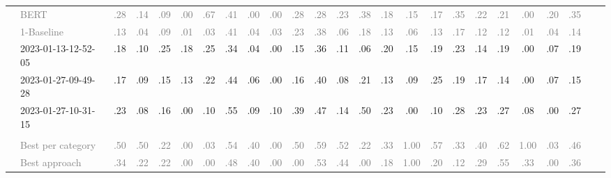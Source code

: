 \begin{table*}
\begin{tabular}{@{}ll@{\hspace{10pt}}c@{\hspace{5pt}}cccccccccccccccccccccc@{}}
& \textcolor{gray}{BERT} & \textcolor{gray}{.28} & \textcolor{gray}{.14} & \textcolor{gray}{.09} & \textcolor{gray}{.00} & \textcolor{gray}{.67} & \textcolor{gray}{.41} & \textcolor{gray}{.00} & \textcolor{gray}{.00} & \textcolor{gray}{.28} & \textcolor{gray}{.28} & \textcolor{gray}{.23} & \textcolor{gray}{.38} & \textcolor{gray}{.18} & \textcolor{gray}{.15} & \textcolor{gray}{.17} & \textcolor{gray}{.35} & \textcolor{gray}{.22} & \textcolor{gray}{.21} & \textcolor{gray}{.00} & \textcolor{gray}{.20} & \textcolor{gray}{.35} \\
& \textcolor{gray}{1-Baseline} & \textcolor{gray}{.13} & \textcolor{gray}{.04} & \textcolor{gray}{.09} & \textcolor{gray}{.01} & \textcolor{gray}{.03} & \textcolor{gray}{.41} & \textcolor{gray}{.04} & \textcolor{gray}{.03} & \textcolor{gray}{.23} & \textcolor{gray}{.38} & \textcolor{gray}{.06} & \textcolor{gray}{.18} & \textcolor{gray}{.13} & \textcolor{gray}{.06} & \textcolor{gray}{.13} & \textcolor{gray}{.17} & \textcolor{gray}{.12} & \textcolor{gray}{.12} & \textcolor{gray}{.01} & \textcolor{gray}{.04} & \textcolor{gray}{.14} \\
& 2023-01-13-12-52-05 & .18 & .10 & .25 & .18 & .25 & .34 & .04 & .00 & .15 & .36 & .11 & .06 & .20 & .15 & .19 & .23 & .14 & .19 & .00 & .07 & .19 \\
& 2023-01-27-09-49-28 & .17 & .09 & .15 & .13 & .22 & .44 & .06 & .00 & .16 & .40 & .08 & .21 & .13 & .09 & .25 & .19 & .17 & .14 & .00 & .07 & .15 \\
& 2023-01-27-10-31-15 & .23 & .08 & .16 & .00 & .10 & .55 & .09 & .10 & .39 & .47 & .14 & .50 & .23 & .00 & .10 & .28 & .23 & .27 & .08 & .00 & .27 \\
\addlinespace
\multicolumn{2}{@{}l}{\emph{New York Times}} \\
& \textcolor{gray}{Best per category} & \textcolor{gray}{.50} & \textcolor{gray}{.50} & \textcolor{gray}{.22} & \textcolor{gray}{.00} & \textcolor{gray}{.03} & \textcolor{gray}{.54} & \textcolor{gray}{.40} & \textcolor{gray}{.00} & \textcolor{gray}{.50} & \textcolor{gray}{.59} & \textcolor{gray}{.52} & \textcolor{gray}{.22} & \textcolor{gray}{.33} & \textcolor{gray}{1.00} & \textcolor{gray}{.57} & \textcolor{gray}{.33} & \textcolor{gray}{.40} & \textcolor{gray}{.62} & \textcolor{gray}{1.00} & \textcolor{gray}{.03} & \textcolor{gray}{.46} \\
& \textcolor{gray}{Best approach} & \textcolor{gray}{.34} & \textcolor{gray}{.22} & \textcolor{gray}{.22} & \textcolor{gray}{.00} & \textcolor{gray}{.00} & \textcolor{gray}{.48} & \textcolor{gray}{.40} & \textcolor{gray}{.00} & \textcolor{gray}{.00} & \textcolor{gray}{.53} & \textcolor{gray}{.44} & \textcolor{gray}{.00} & \textcolor{gray}{.18} & \textcolor{gray}{1.00} & \textcolor{gray}{.20} & \textcolor{gray}{.12} & \textcolor{gray}{.29} & \textcolor{gray}{.55} & \textcolor{gray}{.33} & \textcolor{gray}{.00} & \textcolor{gray}{.36} \\

\end{tabular}
\end{table*}
